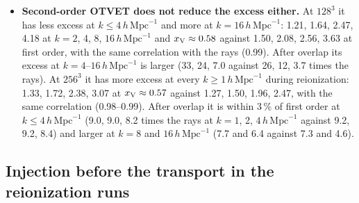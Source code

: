 \documentclass[11pt]{article}
\newcommand{\hmpc}{\,h\,\mathrm{Mpc}^{-1}}
\newcommand{\xv}{x_{\rm V}}
\begin{document}
\begin{itemize}
at $k=2$, 4, 8, $16\hmpc$ is 1.14, 1.47, 1.91, 3.29 at $\xv\approx0.58$ against 0.93, 1.12, 1.47, 3.05 at first order, and the
cross-correlation at $k=1$--$4\hmpc$ falls from 0.89--0.98 to 0.76--0.87. At $256^3$ it is 1.17, 1.40, 1.56, 1.90
against 0.96, 0.99, 1.10, 1.36, and the correlation falls from 0.86--0.95 to 0.75--0.84. After overlap at $256^3$
the second-order run has more power at every $k$: 0.30, 0.55, 0.83, 1.07, 1.41 of the rays' at $k=1$, 2, 4, 8,
$16\hmpc$ against 0.16, 0.35, 0.60, 0.74, 0.98, with a lower correlation (0.73--0.84 against 0.79--0.96 at
$k=1$--$4\hmpc$). The uniform test predicted a modest
reduction of the small-scale power. The cause is not known. It is not the build: a control run of the first-order scheme with the executable
of the second-order run reproduces the original first-order run byte for byte.
\item \textbf{Second-order OTVET does not reduce the excess either.} At $128^3$ it has less excess at
$k\le4\hmpc$ and more at $k=16\hmpc$: 1.21, 1.64,
2.47, 4.18 at $k=2$, 4, 8, $16\hmpc$ and $\xv\approx0.58$ against 1.50, 2.08, 2.56, 3.63 at first order, with the
same correlation with the rays (0.99). After overlap its excess at $k=4$--$16\hmpc$ is larger (33, 24, 7.0 against
26, 12, 3.7 times the rays). At $256^3$ it has more excess at every $k\ge1\hmpc$ during reionization: 1.33, 1.72,
2.38, 3.07 at $\xv\approx0.57$ against 1.27, 1.50, 1.96, 2.47, with the same correlation (0.98--0.99). After
overlap it is within 3\,\% of first order at $k\le4\hmpc$ (9.0, 9.0, 8.2 times the rays at $k=1$, 2, $4\hmpc$ against 9.2, 9.2,
8.4) and larger at $k=8$ and $16\hmpc$ (7.7 and 6.4 against 7.3 and 4.6).
\end{itemize}

\subsection{Injection before the transport in the reionization runs}\label{sec:inject}
\end{document}

